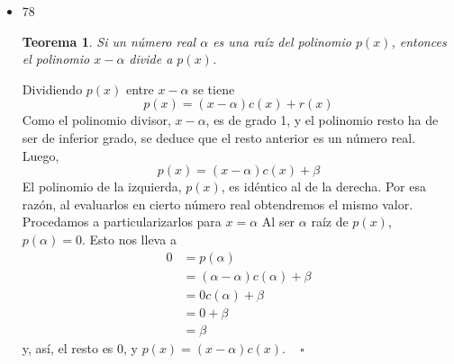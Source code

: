 \documentclass[a4paper,12pt,twoside]{book}
\theoremstyle{teorema}
\newtheorem{teorema}{Teorema}[section]
\theoremstyle{remark}
\newenvironment{demostracion}
{\noindent {\bf Demostración:}}
{\newline\mbox{ } \hfill $\square$}
\begin{document}
\begin{itemize}
\item 78
\begin{teorema}
Si un número real \(\alpha\) es una raíz del polinomio \(p(x)\), entonces el
polinomio \(x - \alpha\) divide a \(p(x)\).
\end{teorema}
\begin{demostracion}
Dividiendo \(p(x)\) entre \(x - \alpha\) se tiene
   $$p(x) = (x - \alpha) c(x) + r (x)$$
Como el polinomio divisor, \(x - \alpha\), es de grado 1, y el polinomio resto
ha de ser de inferior grado, se deduce que el resto anterior es un
número real. Luego,
   $$p(x) = (x - \alpha) c(x) + \beta$$
El polinomio de la izquierda, \(p(x)\), es idéntico al de la derecha. Por
esa razón, al evaluarlos en cierto número real obtendremos el mismo
valor. Procedamos a particularizarlos para \(x = \alpha\)  Al ser \(\alpha\) raíz de
\(p(x)\), \(p(\alpha) = 0\). Esto nos lleva a
\begin{align*}
   0 &= p(\alpha) \\
     &= (\alpha - \alpha) c(\alpha) + \beta \\
     &= 0 c(\alpha) + \beta \\
     &= 0 + \beta \\
     &= \beta
\end{align*}
y, así, el resto es \(0\), y \(p(x) = (x - \alpha)c(x)\).
\end{demostracion}
\end{itemize}
\end{document}
